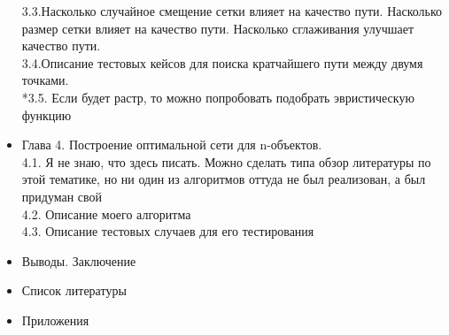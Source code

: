 \begin{itemize}
3.3.Насколько случайное смещение сетки влияет на качество пути. Насколько размер сетки влияет на качество пути. Насколько сглаживания улучшает качество пути.\\
3.4.Описание тестовых кейсов для поиска кратчайшего пути между двумя точками.\\
*3.5. Если будет растр, то можно попробовать подобрать эвристическую функцию
\item Глава 4. Построение оптимальной сети для n-объектов.\\
4.1. Я не знаю, что здесь писать. Можно сделать типа обзор литературы по этой тематике, но ни один из алгоритмов оттуда не был реализован, а был придуман свой\\
4.2. Описание моего алгоритма\\
4.3. Описание тестовых случаев для его тестирования
\item Выводы. Заключение
\item Список литературы
\item Приложения
\end{itemize}
\newpage